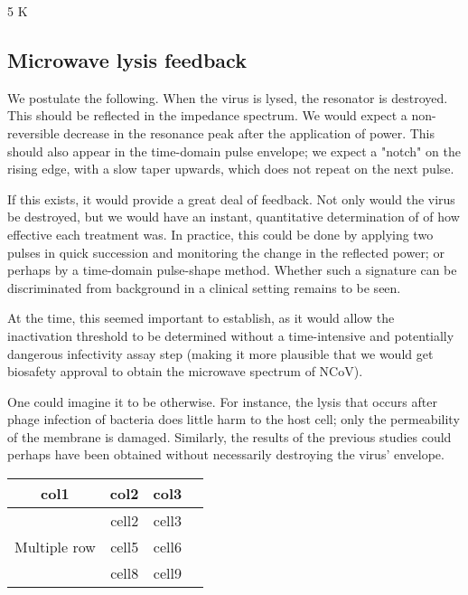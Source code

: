 \documentclass[paper.tex]{subfiles}
\begin{document}

5 K

\subsection{Microwave lysis feedback}

We postulate the following. When the virus is lysed, the resonator is destroyed. This should be reflected in the impedance spectrum.
We would expect a non-reversible decrease in the resonance peak after the application of power. This should also appear in the time-domain pulse envelope; we expect a "notch" on the rising edge, with a slow taper upwards, which does not repeat on the next pulse.

If this exists, it would provide a great deal of feedback. Not only would the virus be destroyed, but we would have an instant, quantitative determination of of how effective each treatment was. In practice, this could be done by applying two pulses in quick succession and monitoring the change in the reflected power; or perhaps by a time-domain pulse-shape method. Whether such a signature can be discriminated from background in a clinical setting remains to be seen.

At the time, this seemed important to establish, as it would allow the inactivation threshold to be determined without a time-intensive and potentially dangerous infectivity assay step (making it more plausible that we would get biosafety approval to obtain the microwave spectrum of NCoV). 

One could imagine it to be otherwise. For instance, the lysis that occurs after phage infection of bacteria does little harm to the host cell; only the permeability of the membrane is damaged\cite{GROWTH}. Similarly, the results of the previous studies could perhaps have been obtained without necessarily destroying the virus' envelope.



\begin{center}
	\begin{tabular}{ |c|c|c|c| } 
		\hline
		col1 & col2 & col3 \\
		\hline
		\multirow{3}{4em}{Multiple row} 
		& cell2 & cell3 \\ 
		& cell5 & cell6 \\ 
		& cell8 & cell9 \\ 
		\hline
	\end{tabular}
\end{center}
\end{document}

